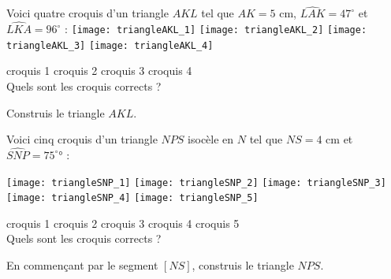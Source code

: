 
\begin{activite}

\begin{partie}
Voici quatre croquis d'un triangle $AKL$ tel que $AK = 5$ cm, $\widehat{LAK} = 47^\circ$ et $\widehat{LKA} = 96^\circ$ :
\texttt{[image: triangleAKL\_1]} \hfill \texttt{[image: triangleAKL\_2]} \hfill \texttt{[image: triangleAKL\_3]} \hfill \texttt{[image: triangleAKL\_4]}

\qquad croquis 1 \hfill croquis 2 \hfill croquis 3 \hfill croquis 4 \hfill \\[1em]
Quels sont les croquis corrects ?
\end{partie}

\begin{partie}
Construis le triangle $AKL$.
\end{partie}

\end{activite}



\begin{activite}

\begin{partie}
Voici cinq croquis d'un triangle $NPS$ isocèle en $N$ tel que $NS = 4$ cm et $\widehat{SNP} = 75^\circ°$ :

\texttt{[image: triangleSNP\_1]} \hfill \texttt{[image: triangleSNP\_2]} \hfill \texttt{[image: triangleSNP\_3]} \hfill \texttt{[image: triangleSNP\_4]} \hfill \texttt{[image: triangleSNP\_5]} 

\quad croquis 1 \hfill croquis 2 \hfill croquis 3 \hfill croquis 4 \hfill croquis 5 \\[1em]
Quels sont les croquis corrects ?
\end{partie}

\begin{partie}
En commençant par le segment $[NS]$, construis le triangle $NPS$.
\end{partie}

\end{activite}
